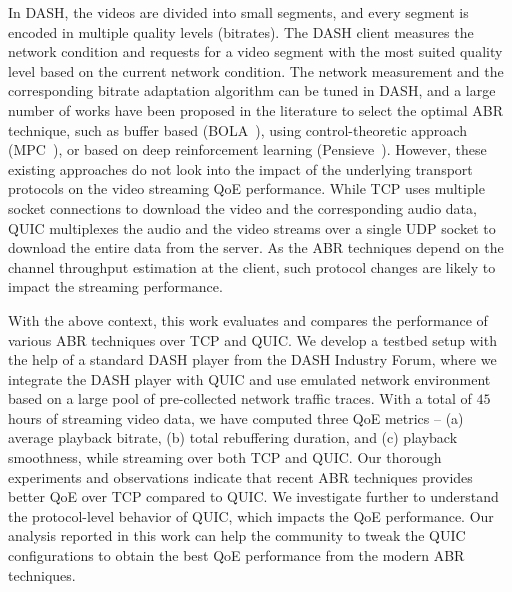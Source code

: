 In DASH, the videos are divided into small segments, and every segment is encoded in multiple quality levels (bitrates). The DASH client measures the network condition and requests for a video segment with the most suited quality level based on the current network condition. The network measurement and the corresponding bitrate adaptation algorithm can be tuned in DASH, and a large number of works have been proposed in the literature to select the optimal ABR technique, such as buffer based (BOLA~\cite{bola-2016}), using control-theoretic approach (MPC~\cite{yin2015control}), or based on deep reinforcement learning (Pensieve~\cite{mao2017neural}). However, these existing approaches do not look into the impact of the underlying transport protocols on the video streaming QoE performance. While TCP uses multiple socket connections to download the video and the corresponding audio data, QUIC multiplexes the audio and the video streams over a single UDP socket to download the entire data from the server. 
As the ABR techniques depend on the channel throughput estimation at the client, such protocol changes are likely to impact the streaming performance. 



With the above context, this work evaluates and compares the performance of various ABR techniques over TCP and QUIC. We develop a testbed setup with the help of a standard DASH player from the DASH Industry Forum, where we integrate the DASH player with QUIC and use emulated network environment based on a large pool of pre-collected network traffic traces. 
With a total of $45$ hours of streaming video data, we have computed three QoE metrics -- (a) average playback bitrate, (b) total rebuffering duration, and (c) playback smoothness, while streaming over both TCP and QUIC. Our thorough experiments and observations indicate that recent ABR techniques provides better QoE over TCP compared to QUIC. We investigate further to understand the protocol-level behavior of QUIC, which impacts the QoE performance.
Our analysis reported in this work can help the community to tweak the QUIC configurations to obtain the best QoE performance from the modern ABR techniques. 

